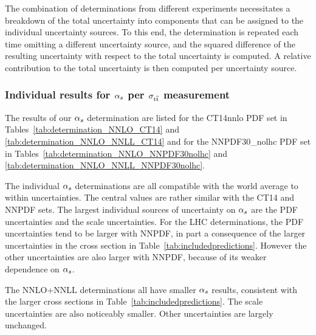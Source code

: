 The combination of determinations from different experiments
necessitates a breakdown of the total uncertainty into components that
can be assigned to the individual uncertainty sources.  To this end,
the determination is repeated each time omitting a different
uncertainty source, and the squared difference of the resulting
uncertainty with respect to the total uncertainty is computed.  A
relative contribution to the total uncertainty is then computed per
uncertainty source. 

\subsubsection{Individual results for \texorpdfstring{$\alpha_s$}{alphas} per \texorpdfstring{$\sigma_{\mathrm{t}\overline{\mathrm{t}}}$}{sigma-tt} measurement}
\label{sec:results-by-exp}

The results of our $\alpha_s$ determination are listed for the CT14nnlo
PDF set in Tables~\ref{tab:determination_NNLO_CT14} and
\ref{tab:determination_NNLO_NNLL_CT14} and for the
NNPDF30\_nolhc PDF set in
Tables~\ref{tab:determination_NNLO_NNPDF30nolhc} and
\ref{tab:determination_NNLO_NNLL_NNPDF30nolhc}.

The individual $\alpha_s$ determinations are all compatible with the world
average to within uncertainties.
%
The central values are rather similar with the CT14 and NNPDF sets.
%
The largest individual sources of uncertainty on $\alpha_s$ are the PDF
uncertainties and the scale uncertainties.
%
For the LHC determinations, the PDF uncertainties tend to be larger
with NNPDF, in part a consequence of the larger uncertainties in the
cross section in Table~\ref{tab:includedpredictions}. 
%
However the other uncertainties are also larger with NNPDF, because
of its weaker dependence on $\alpha_s$.

The NNLO+NNLL determinations all have smaller $\alpha_s$ results,
consistent with the larger cross sections in
Table~\ref{tab:includedpredictions}.
%
The scale uncertainties are also noticeably smaller.
%
Other uncertainties are largely unchanged.


